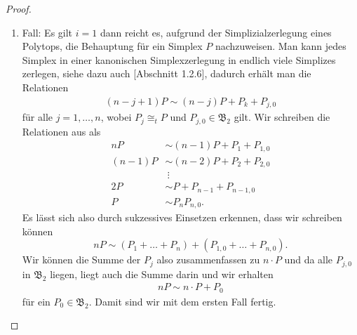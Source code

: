 \documentclass[11pt,titlepage]{article}
\theoremstyle{definition}
\theoremstyle{remark}
\begin{document}
	\begin{proof}
		\begin{enumerate}
			\item Fall: Es gilt $i=1$ dann reicht es, aufgrund 
			der Simplizialzerlegung eines Polytops, die 
			Behauptung für ein Simplex $P$ nachzuweisen. Man kann jedes 
			Simplex in einer kanonischen Simplexzerlegung in endlich 
			viele Simplizes zerlegen, 
			siehe dazu auch \cite{Hadwiger}[Abschnitt 1.2.6], dadurch erhält 
			man die Relationen
			\begin{align*}
				(n-j +1)P\sim(n-j )P+P_k+P_{j, 0} 
			\end{align*}
			für alle $j=1,\ldots,n$, wobei $P_{j}\cong_t P$ und 
			$P_{j, 0}\in\mathfrak{B}_2$ gilt. Wir schreiben die Relationen 
			aus als
			\begin{align*}
				nP &\sim (n-1)P+P_1+P_{1,0} \\
				(n-1)P &\sim (n-2)P+P_2 +P_{2,0} \\
				&\ \vdots \\
				2P &\sim P +P_{n-1}+P_{n-1,0} \\
				P&\sim P_n P_{n,0}.
			\end{align*}
			Es lässt sich also durch sukzessives Einsetzen erkennen, dass wir 
			schreiben können 
			\[nP\sim (P_1+\ldots+P_n)+(P_{1,0}+\ldots+P_{n,0}).\]
			Wir können die Summe der $P_{j}$ also zusammenfassen zu $n \cdot P$ 
			und da alle $P_{j,0}$ in $\mathfrak{B}_2$ liegen, liegt auch 
			die Summe darin und wir erhalten
			\begin{align}
				nP\sim n\cdot P+ P_0 \label{thm:zyl;1}
			\end{align}
			für ein $P_0\in\mathfrak{B}_2$. Damit sind wir mit dem 
			ersten Fall fertig.
			

\end{enumerate}
\end{proof}
\end{document}

